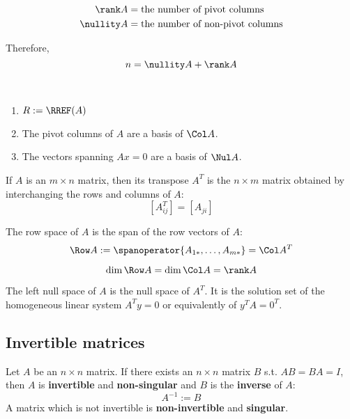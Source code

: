 \begin{lemma}
  \begin{align*}
    \rank A &= \text{the number of pivot columns} \\
    \nullity A &= \text{the number of non-pivot columns}
  \end{align*}
  
  Therefore,
  \[
    n = \nullity A + \rank A
  \]
\end{lemma}

\begin{procedure} \ \\
  \begin{enumerate}
    \item $R := \RREF(A)$
    \item The pivot columns of $A$ are a basis of $\Col A$.
    \item The vectors spanning $Ax = 0$ are a basis of $\Nul A$.
  \end{enumerate}
\end{procedure}

\begin{definition}
  If $A$ is an $m \times n$ matrix, then its transpose $A^T$ is the $n \times m$ matrix obtained by interchanging the rows and columns of $A$:
  \[
    \left[A^T_{ij}\right] = \left[A_{ji}\right]
  \]
\end{definition}

\begin{definition}
  The row space of $A$ is the span of the row vectors of $A$:
  \[
    \Row A := \spanoperator \{ A_{1*}, \ldots, A_{m*} \} = \Col A^T
  \]
\end{definition}

\begin{lemma}
  \[
    \dim \Row A = \dim \Col A = \rank A
  \]
\end{lemma}

\begin{definition}
  The left null space of $A$ is the null space of $A^T$. It is the solution set of the homogeneous linear system $A^T y = 0$ or equivalently of $y^T A = 0^T$.
\end{definition}

\subsection{Invertible matrices}

\begin{definition}
  Let $A$ be an $n \times n$ matrix. If there exists an $n \times n$ matrix $B$ s.t. $AB = BA = I$, then $A$ is \textbf{invertible} and \textbf{non-singular} and $B$ is the \textbf{inverse} of $A$:
  \[
    A^{-1} := B
  \]
  A matrix which is not invertible is \textbf{non-invertible} and \textbf{singular}.
\end{definition}

